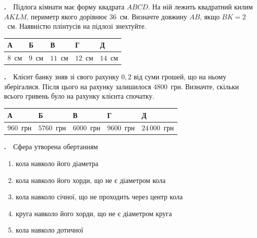 \documentclass[12pt]{article}
\newcommand{\answerTable}[5]{%
\par\vspace{0.15cm}
\noindent
\begin{tabular}{|*{5}{>{\centering\arraybackslash}m{3cm}|}}
\hline
\rule[-0.15cm]{0pt}{0.6cm}\textbf{А} & \rule[-0.15cm]{0pt}{0.6cm}\textbf{Б} & \rule[-0.15cm]{0pt}{0.6cm}\textbf{В} & \rule[-0.15cm]{0pt}{0.6cm}\textbf{Г} & \rule[-0.15cm]{0pt}{0.6cm}\textbf{Д} \\
\hline
\rule[-0.2cm]{0pt}{0.75cm}#1 & \rule[-0.2cm]{0pt}{0.75cm}#2 & \rule[-0.2cm]{0pt}{0.75cm}#3 & \rule[-0.2cm]{0pt}{0.75cm}#4 & \rule[-0.2cm]{0pt}{0.75cm}#5 \\
\hline
\end{tabular}
\par\vspace{0.25cm}
}
\newcounter{zad}
\newcommand{\zadtask}[1]{\stepcounter{zad}\par\vspace{0.3cm}\noindent\textbf{\thezad.}\ \ #1\par\vspace{0.2cm}}
\newcommand{\zadnum}{\stepcounter{zad}\noindent\textbf{\thezad.}\ \ }
\begin{document}
\noindent
\begin{minipage}[c]{0.60\textwidth}
\zadnum Підлога кімнати має форму квадрата $ABCD$. На ній лежить квадратний килим $AKLM$, периметр якого дорівнює $36$~см. Визначте довжину $AB$, якщо $BK = 2$~см. Наявністю плінтусів на підлозі знехтуйте.
\end{minipage}%
\hfill
\begin{minipage}[c]{0.38\textwidth}
\centering
{}
\end{minipage}
\par\vspace{0.2cm}
\answerTable{$8$~см}{$9$~см}{$11$~см}{$12$~см}{$14$~см}

\zadtask{Клієнт банку зняв зі свого рахунку $0{,}2$ від суми грошей, що на ньому зберігалися. Після цього на рахунку залишилося $4800$~грн. Визначте, скільки всього гривень було на рахунку клієнта спочатку.}
\answerTable{$960$~грн}{$5760$~грн}{$6000$~грн}{$9600$~грн}{$24\,000$~грн}

\zadtask{Сфера утворена обертанням
\vspace{0.1cm}
\begin{enumerate}[label=\textbf{\Alph*}, leftmargin=2.8em, itemsep=0.1cm]
    \item кола навколо його діаметра
    \item кола навколо його хорди, що не є діаметром кола
    \item кола навколо січної, що не проходить через центр кола
    \item круга навколо його хорди, що не є діаметром круга
    \item кола навколо дотичної
\end{enumerate}
\vspace{0.1cm}}
\end{document}
